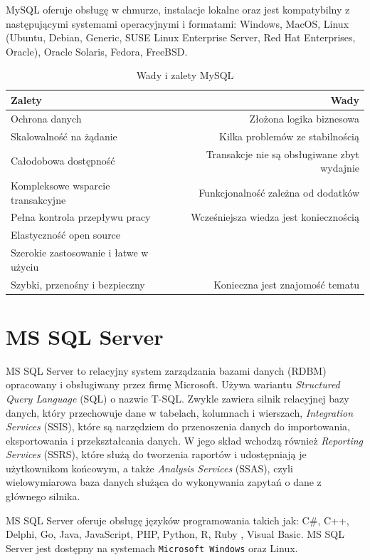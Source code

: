 \documentclass[oneside,polski,logo,indent]{amuthesis}
\begin{document}
MySQL oferuje obsługę w chmurze, instalacje lokalne oraz jest kompatybilny z następującymi systemami operacyjnymi i formatami: Windows, MacOS, Linux (Ubuntu, Debian, Generic, SUSE Linux Enterprise Server, Red Hat Enterprises, Oracle), Oracle Solaris, Fedora, FreeBSD.

\begin{table}[H]
\caption{Wady i zalety MySQL}
\label{tabela-MySQL}
\centering
\begin{adjustbox}{width=1\textwidth}
\small
\begin{tabular}{lr}
\toprule
Zalety & Wady\\
\midrule
Ochrona danych & Złożona logika biznesowa\\
Skalowalność na żądanie & Kilka problemów ze stabilnością\\
Całodobowa dostępność & Transakcje nie są obsługiwane zbyt wydajnie\\
Kompleksowe wsparcie transakcyjne & Funkcjonalność zależna od dodatków\\
Pełna kontrola przepływu pracy & Wcześniejsza wiedza jest koniecznością\\
Elastyczność open source &\\
Szerokie zastosowanie i łatwe w użyciu &\\
Szybki, przenośny i bezpieczny & Konieczna jest znajomość tematu\\
\bottomrule
\end{tabular}
\end{adjustbox}
\end{table}
\section{MS SQL Server}
MS SQL Server to relacyjny system zarządzania bazami danych (RDBM) opracowany i obsługiwany przez firmę Microsoft. Używa wariantu \emph{Structured Query Language} (SQL) o nazwie T-SQL. Zwykle zawiera silnik relacyjnej bazy danych, który przechowuje dane w tabelach, kolumnach i wierszach,  \emph{Integration Services} (SSIS), które są narzędziem do przenoszenia danych do importowania, eksportowania i przekształcania danych. W jego skład wchodzą również \emph{Reporting Services} (SSRS), które służą do tworzenia raportów i udostępniają je użytkownikom końcowym, a także  \emph{Analysis Services} (SSAS), czyli wielowymiarowa baza danych służąca do wykonywania zapytań o dane z głównego silnika. 

MS SQL Server oferuje obsługę języków programowania takich jak: C\#, C++, Delphi, Go, Java, JavaScript, PHP, Python, R, Ruby , Visual Basic.
MS SQL Server jest dostępny na systemach \texttt{Microsoft Windows} oraz Linux.
\end{document}
